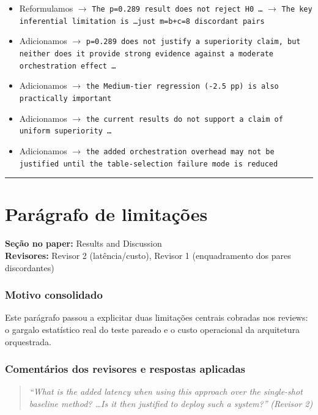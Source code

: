 \documentclass[11pt,a4paper]{article}
\begin{document}
\begin{trackblock}
\begin{itemize}
  \item Reformulamos $\to$ \texttt{The p=0.289 result does not reject H0 \ldots} $\to$ \texttt{The key inferential limitation is \ldots just m=b+c=8 discordant pairs}
  \item Adicionamos $\to$ \texttt{p=0.289 does not justify a superiority claim, but neither does it provide strong evidence against a moderate orchestration effect \ldots}
  \item Adicionamos $\to$ \texttt{the Medium-tier regression (-2.5 pp) is also practically important}
  \item Adicionamos $\to$ \texttt{the current results do not support a claim of uniform superiority \ldots}
  \item Adicionamos $\to$ \texttt{the added orchestration overhead may not be justified until the table-selection failure mode is reduced}
\end{itemize}
\end{trackblock}

\bigskip\hrule\bigskip

\section{Parágrafo de limitações}

\textbf{Seção no paper:} Results and Discussion\\
\textbf{Revisores:} Revisor 2 (latência/custo), Revisor 1 (enquadramento dos pares discordantes)

\subsubsection*{Motivo consolidado}

Este parágrafo passou a explicitar duas limitações centrais cobradas nos reviews: o gargalo estatístico real do teste pareado e o custo operacional da arquitetura orquestrada.

\subsubsection*{Comentários dos revisores e respostas aplicadas}

\begin{quote}
\textit{``What is the added latency when using this approach over the single-shot baseline method? \ldots Is it then justified to deploy such a system?''}
\hfill\textit{(Revisor 2)}
\end{quote}
\end{document}
